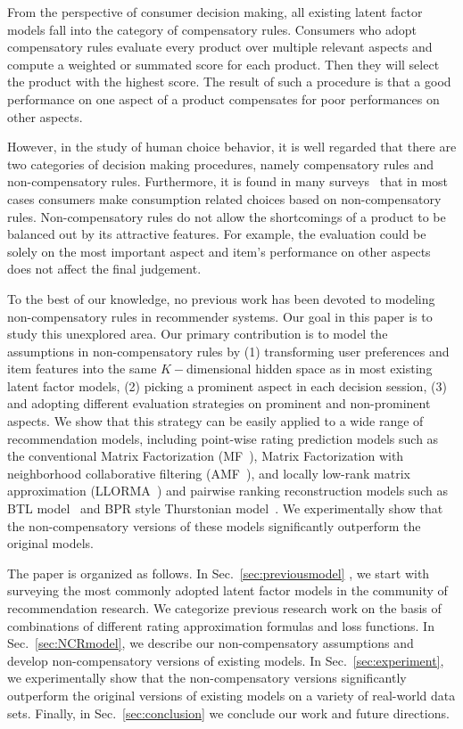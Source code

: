 \documentclass[letterpaper]{article} %
\begin{document}
From the perspective of consumer decision making, all existing latent factor models fall into the category of compensatory rules. Consumers who adopt compensatory rules evaluate every product over multiple relevant aspects and compute a weighted or summated score for each product. Then they will select the product with the highest score. The result of such a procedure is  that a good performance on one aspect of a product compensates for poor performances on other aspects. 


However, in the study of human choice behavior, it is well regarded that there are two categories of decision making procedures, namely compensatory rules and non-compensatory rules. Furthermore, it is found in many surveys~\cite{Engel1986Consumer} that in most cases consumers make consumption related choices based on non-compensatory rules. Non-compensatory rules do not allow the shortcomings of a product to be balanced out by its attractive features. For example, the evaluation could be solely on the most important aspect and item's performance on other aspects does not affect the final judgement.

To the best of our knowledge, no previous work has been devoted to modeling non-compensatory rules in recommender systems. Our goal in this paper is to study this unexplored area. Our primary contribution is to model the assumptions in non-compensatory rules by (1) transforming user preferences and item features into the same $K-$dimensional hidden space as in most existing latent factor models, (2) picking a prominent aspect in each decision session, (3) and adopting different evaluation strategies on prominent and non-prominent aspects. We show that this strategy can be easily applied to a wide range of recommendation models, including point-wise rating prediction models such as the conventional Matrix Factorization (MF~\cite{Koren2009Matrix}), Matrix Factorization with neighborhood collaborative filtering (AMF~\cite{Koren2008Factorization}), and locally low-rank matrix approximation (LLORMA~\cite{Lee2013Local}) and pairwise ranking reconstruction models such as BTL model~\cite{Hu2016Improved} and BPR style  Thurstonian model~\cite{Rendle2009BPR}. We experimentally show that the non-compensatory versions of these models significantly outperform the original models.

The paper is organized as follows. In Sec.~\ref{sec:previousmodel} , we start with surveying the most commonly adopted latent factor models in the community of recommendation research. We categorize previous research work on the basis of  combinations of  different rating approximation formulas and  loss functions. In Sec.~\ref{sec:NCRmodel}, we describe our non-compensatory assumptions and develop non-compensatory versions of existing models. In Sec.~\ref{sec:experiment}, we experimentally show that the non-compensatory versions significantly outperform the original versions of existing models on a variety of real-world data sets. Finally, in Sec.~\ref{sec:conclusion} we conclude our work and future directions.
\end{document}
